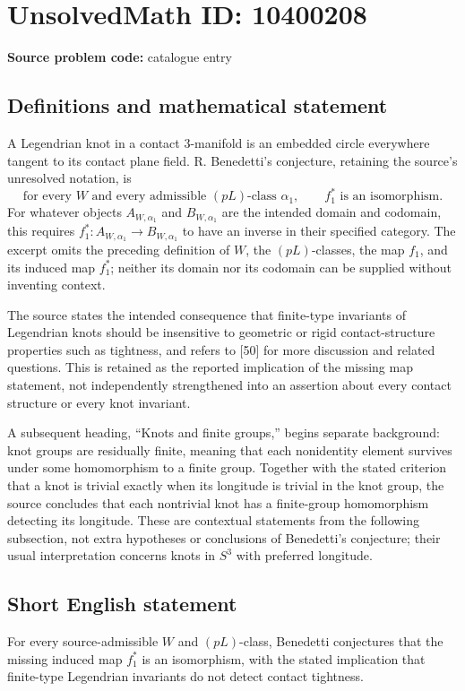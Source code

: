 \documentclass[11pt]{article}
\begin{document}
\section*{UnsolvedMath ID: 10400208}
\textbf{Source problem code:} catalogue entry
\subsection{Definitions and mathematical statement}
A Legendrian knot in a contact \(3\)-manifold is an embedded circle everywhere tangent to its contact plane field. R. Benedetti's conjecture, retaining the source's unresolved notation, is
\[
 \text{for every }W\text{ and every admissible }(pL)\text{-class }\alpha_1,
 \qquad f_1^*\text{ is an isomorphism}.
\]
For whatever objects \(A_{W,\alpha_1}\) and \(B_{W,\alpha_1}\) are the intended domain and codomain, this requires \(f_1^*:A_{W,\alpha_1}\to B_{W,\alpha_1}\) to have an inverse in their specified category. The excerpt omits the preceding definition of \(W\), the \((pL)\)-classes, the map \(f_1\), and its induced map \(f_1^*\); neither its domain nor its codomain can be supplied without inventing context.

The source states the intended consequence that finite-type invariants of Legendrian knots should be insensitive to geometric or rigid contact-structure properties such as tightness, and refers to [50] for more discussion and related questions. This is retained as the reported implication of the missing map statement, not independently strengthened into an assertion about every contact structure or every knot invariant.

A subsequent heading, ``Knots and finite groups,'' begins separate background: knot groups are residually finite, meaning that each nonidentity element survives under some homomorphism to a finite group. Together with the stated criterion that a knot is trivial exactly when its longitude is trivial in the knot group, the source concludes that each nontrivial knot has a finite-group homomorphism detecting its longitude. These are contextual statements from the following subsection, not extra hypotheses or conclusions of Benedetti's conjecture; their usual interpretation concerns knots in \(S^3\) with preferred longitude.
\subsection{Short English statement}
For every source-admissible \(W\) and \((pL)\)-class, Benedetti conjectures that the missing induced map \(f_1^*\) is an isomorphism, with the stated implication that finite-type Legendrian invariants do not detect contact tightness.
\end{document}
